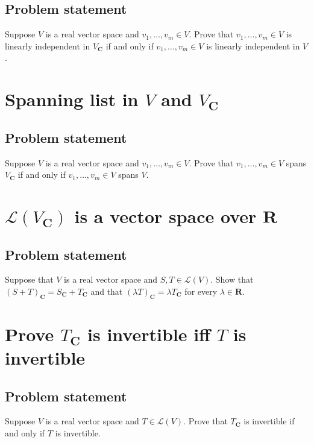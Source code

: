 \documentclass{article}
\begin{document}
\subsection*{Problem statement}
Suppose $V$ is a real vector space and $v_1,\ldots,v_m\in V$. 
Prove that $v_1,\ldots,v_m\in V$ is linearly independent in $V_{\mathbf{C}}$ if and only if $v_1,\ldots,v_m\in V$ is linearly independent in $V$.

\clearpage

\section{Spanning list in $V$ and $V_{\mathbf{C}}$}
\subsection*{Problem statement}
Suppose $V$ is a real vector space and $v_1,\ldots,v_m\in V$. 
Prove that $v_1,\ldots,v_m\in V$ spans $V_{\mathbf{C}}$ if and only if $v_1,\ldots,v_m\in V$ spans $V$.

\clearpage

\section{$\mathcal{L}(V_{\mathbf{C}})$ is a vector space over $\mathbf{R}$}
\subsection*{Problem statement}
Suppose that $V$ is a real vector space and $S,T\in\mathcal{L}(V)$. 
Show that \newline
$(S+T)_{\mathbf{C}}=S_{\mathbf{C}}+T_{\mathbf{C}}$ and that $(\lambda T)_{\mathbf{C}}=\lambda T_{\mathbf{C}}$ for every $\lambda\in\mathbf{R}$.

\clearpage

\section{Prove $T_{\mathbf{C}}$ is invertible iff $T$ is invertible}
\subsection*{Problem statement}
Suppose $V$ is a real vector space and $T\in\mathcal{L}(V)$. Prove that $T_{\mathbf{C}}$ is invertible if and only if $T$ is invertible.

\clearpage
\end{document}
